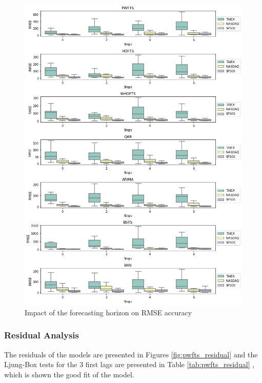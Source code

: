 \begin{figure}[htb]
    \centering
    \includegraphics[width=\textwidth]{figures/pwfts_ahead_point.png}
    \caption{Impact of the forecasting horizon on RMSE accuracy}
    \label{fig:pwfts_ahead_point}
\end{figure}

\subsubsection{Residual Analysis}
\label{sec:pwfts_residual}

The residuals of the models are presented in Figures \ref{fig:pwfts_residual} and the Ljung-Box tests for the 3 first lags are presented in Table \ref{tab:pwfts_residual} , which is shown the good fit of the model. 

